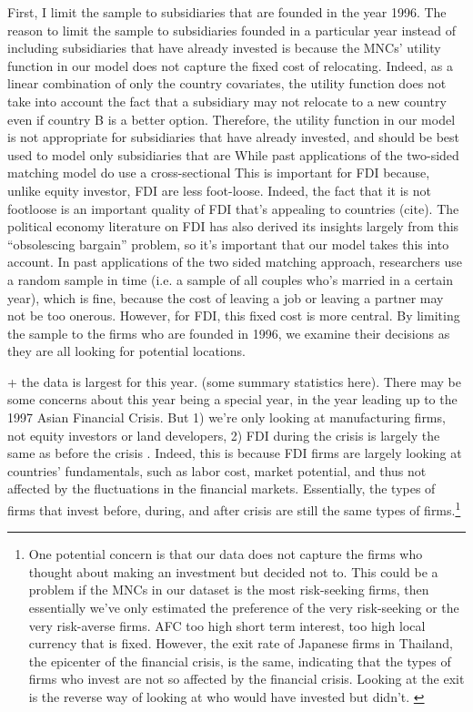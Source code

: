 \message{ !name(AnhLe_dissertation.tex)}\documentclass[]{dukedissertation}
\begin{document}
First, I limit the sample to subsidiaries that are founded in the year 1996. The
reason to limit the sample to subsidiaries founded in a particular year instead
of including subsidiaries that have already invested is because the MNCs'
utility function in our model does not capture the fixed cost of relocating.
Indeed, as a linear combination of only the country covariates, the utility
function does not take into account the fact that a subsidiary may not relocate
to a new country even if country B is a better option. Therefore, the utility
function in our model is not appropriate for subsidiaries that have already
invested, and should be best used to model only subsidiaries that are While past
applications of the two-sided matching model do use a cross-sectional This is
important for FDI because, unlike equity investor, FDI are less foot-loose.
Indeed, the fact that it is not footloose is an important quality of FDI that's
appealing to countries (cite). The political economy literature on FDI has also
derived its insights largely from this ``obsolescing bargain'' problem, so it's
important that our model takes this into account. In past applications of the
two sided matching approach, researchers use a random sample in time (i.e. a
sample of all couples who's married in a certain year), which is fine, because
the cost of leaving a job or leaving a partner may not be too onerous. However,
for FDI, this fixed cost is more central. By limiting the sample to the firms
who are founded in 1996, we examine their decisions as they are all looking for
potential locations.

+ the data is largest for this year. (some summary statistics here). There may
be some concerns about this year being a special year, in the year leading up to
the 1997 Asian Financial Crisis. But 1) we're only looking at manufacturing
firms, not equity investors or land developers, 2) FDI during the crisis is
largely the same as before the crisis \citep{UNCTAD1998}. Indeed, this is
because FDI firms are largely looking at countries' fundamentals, such as labor
cost, market potential, and thus not affected by the fluctuations in the
financial markets. Essentially, the types of firms that invest before, during,
and after crisis are still the same types of firms.\footnote{One potential
  concern is that our data does not capture the firms who thought about making
  an investment but decided not to. This could be a problem if the MNCs in our
  dataset is the most risk-seeking firms, then essentially we've only estimated
  the preference of the very risk-seeking or the very risk-averse firms. AFC too
  high short term interest, too high local currency that is fixed. However, the
  exit rate of Japanese firms in Thailand, the epicenter of the financial
  crisis, is the same, indicating that the types of firms who invest are not so
  affected by the financial crisis. Looking at the exit is the reverse way of
  looking at who would have invested but didn't. \citep{Delios2001}}
\end{document}

